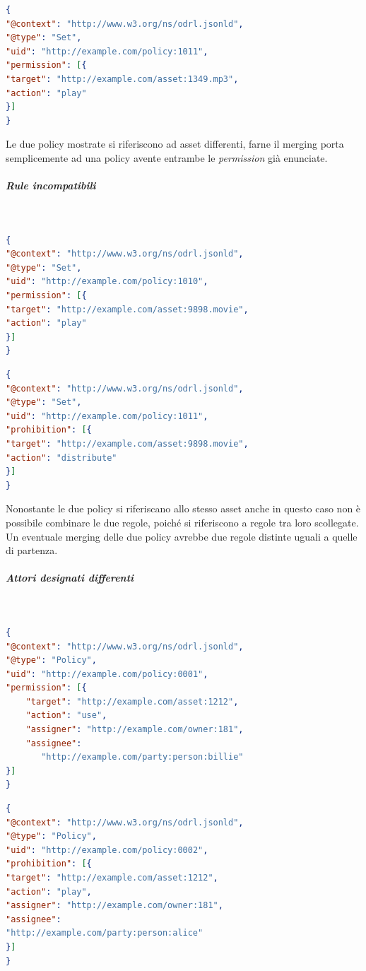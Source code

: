\documentclass[12pt,a4paper,twoside]{book}
\begin{document}
\begin{lstlisting}[language=json,firstnumber=1,caption={La policy 1011 consente la riproduzione dell'asset 1349.mp3 a chiunque},captionpos=b]
{
"@context": "http://www.w3.org/ns/odrl.jsonld",
"@type": "Set",
"uid": "http://example.com/policy:1011",
"permission": [{
"target": "http://example.com/asset:1349.mp3",
"action": "play"
}]
}
\end{lstlisting}
Le due policy mostrate si riferiscono ad asset differenti, farne il merging porta semplicemente ad una policy avente entrambe le \textit{permission} già enunciate.
\subparagraph{Rule incompatibili}\mbox{}\\
\begin{lstlisting}[language=json,firstnumber=1,caption={La policy 1010 consente la riproduzione dell'asset 9898.movie a chiunque},captionpos=b]
{
"@context": "http://www.w3.org/ns/odrl.jsonld",
"@type": "Set",
"uid": "http://example.com/policy:1010",
"permission": [{
"target": "http://example.com/asset:9898.movie",
"action": "play"
}]
}
\end{lstlisting}
\begin{lstlisting}[language=json,firstnumber=1,caption={La policy 1011 proibisce la distribuzione dell'asset 9898.movie a chiunque},captionpos=b]
{
"@context": "http://www.w3.org/ns/odrl.jsonld",
"@type": "Set",
"uid": "http://example.com/policy:1011",
"prohibition": [{
"target": "http://example.com/asset:9898.movie",
"action": "distribute"
}]
}
\end{lstlisting}
Nonostante le due policy si riferiscano allo stesso asset anche in questo caso non è possibile combinare le due regole, poiché si riferiscono a regole tra loro scollegate. Un eventuale merging delle due policy avrebbe due regole distinte uguali a quelle di partenza.\newpage
\subparagraph{Attori designati differenti}\mbox{}\\
\begin{lstlisting}[language=json,firstnumber=1,caption={La policy 0001 permette un qualsiasi utilizzo dell'asset 1212 da parte del soggetto Billie},captionpos=b]
{
"@context": "http://www.w3.org/ns/odrl.jsonld",
"@type": "Policy",
"uid": "http://example.com/policy:0001",
"permission": [{
	"target": "http://example.com/asset:1212",
	"action": "use",
	"assigner": "http://example.com/owner:181",
	"assignee": 
	   "http://example.com/party:person:billie"
}]
}
\end{lstlisting}
\begin{lstlisting}[language=json,firstnumber=1,caption={La policy 0002 proibisce la riproduzione dell'asset 1212 da parte del soggetto Alice},captionpos=b]
{
"@context": "http://www.w3.org/ns/odrl.jsonld",
"@type": "Policy",
"uid": "http://example.com/policy:0002",
"prohibition": [{
"target": "http://example.com/asset:1212",
"action": "play",
"assigner": "http://example.com/owner:181",
"assignee": 
"http://example.com/party:person:alice"
}]
}
\end{lstlisting}
\end{document}
